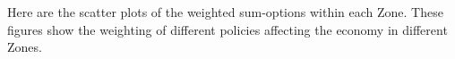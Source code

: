 \documentclass{mcmthesis}
\numberwithin{figure}{section}
\numberwithin{table}{section}
\numberwithin{equation}{section}
\begin{document}

Here are the scatter plots of the weighted sum-options within each Zone.
These figures show the weighting of different policies affecting the economy in different Zones.
\end{document}
